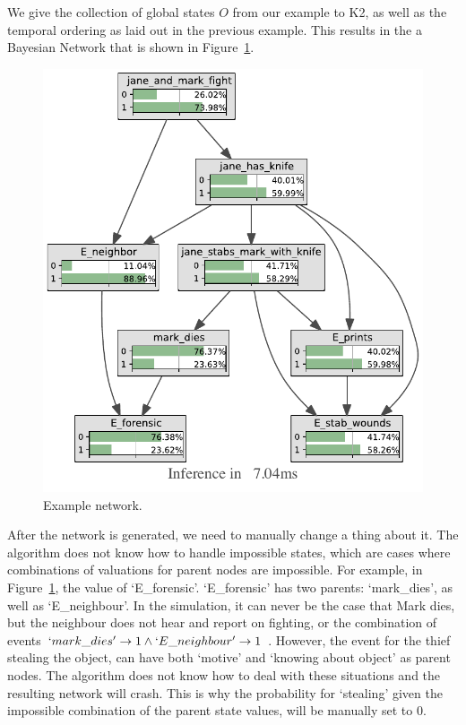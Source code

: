 \begin{example}
We give the collection of global states $O$ from our example to K2, as well as the temporal ordering as laid out in the previous example. This results in the a Bayesian Network that is shown in Figure~\ref{genepool}.

\begin{figure}
\includegraphics[width=\linewidth]{../experiments/WalkThrough/bnImage/BNIMAGEWalkThrough.pdf}
\caption{Example network.}
\label{genepool}
\end{figure}
\end{example}

After the network is generated, we need to manually change a thing about it. The algorithm does not know how to handle impossible states, which are cases where combinations of valuations for parent nodes are impossible. For example, in Figure~\ref{genepool}, the value of `E\_forensic'. `E\_forensic' has two parents: `mark\_dies', as well as `E\_neighbour'. In the simulation, it can never be the case that Mark dies, but the neighbour does not hear and report on fighting, or the combination of events $`mark\_dies' \rightarrow 1 \land `E\_neighbour' \rightarrow 1$ .  However, the event for the thief stealing the object, can have both `motive' and `knowing about object' as parent nodes. The algorithm does not know how to deal with these situations and the resulting network will crash. This is why the probability for `stealing' given the impossible combination of the parent state values, will be manually set to 0. 


